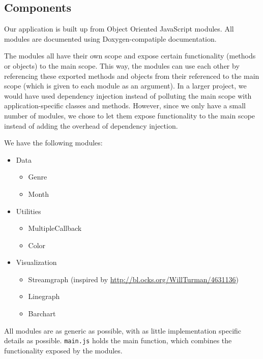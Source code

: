 	\subsection{Components}
		Our application is built up from Object Oriented JavaScript modules.
		All modules are documented using Doxygen-compatiple documentation.

		The modules all have their own scope and expose certain functionality (methods or objects) to the main scope.
		This way, the modules can use each other by referencing these exported methods and objects from their referenced to the main scope (which is given to each module as an argument).
		In a larger project, we would have used dependency injection instead of polluting the main scope with application-specific classes and methods.
		However, since we only have a small number of modules, we chose to let them expose functionality to the main scope instead of adding the overhead of dependency injection.

		We have the following modules:

		\begin{itemize}
			\item Data
				\begin{itemize}
					\item Genre
					\item Month
				\end{itemize}
			\item Utilities
				\begin{itemize}
					\item MultipleCallback
					\item Color
				\end{itemize}
			\item Visualization
				\begin{itemize}
					\item Streamgraph (inspired by \url{http://bl.ocks.org/WillTurman/4631136})
					\item Linegraph
					\item Barchart
				\end{itemize}
		\end{itemize}

		All modules are as generic as possible, with as little implementation specific details as possible.
		\texttt{main.js} holds the main function, which combines the functionality exposed by the modules.

